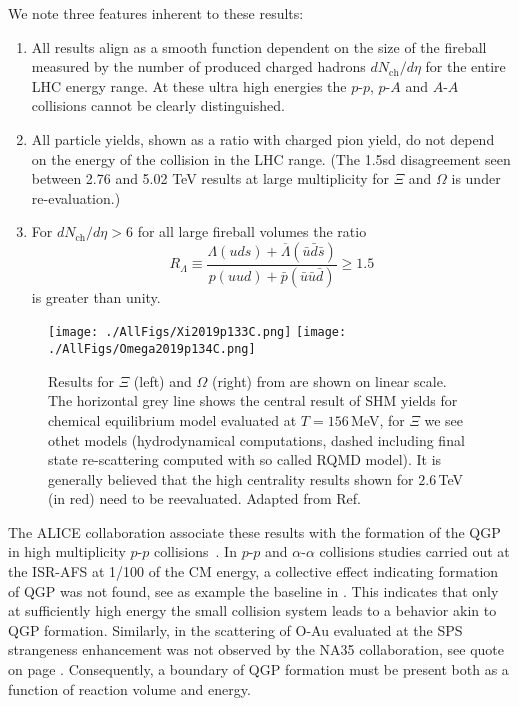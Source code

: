 We note three features inherent to these results:
\begin{enumerate}
\item
All results align as a smooth function dependent on the size of the fireball measured by the number of produced charged hadrons $dN_\mathrm{ch}/d\eta$ for the entire LHC energy range. At these ultra high energies the $p$-$p$, $p$-$A$ and $A$-$A$ collisions cannot be clearly distinguished.
\item
All particle yields, shown as a ratio with charged pion yield, do not depend on the energy of the collision in the LHC range. (The 1.5sd disagreement seen between 2.76 and 5.02 TeV results at large multiplicity for $\Xi$ and $\Omega$ is under re-evaluation.) 
\item
For $dN_\mathrm{ch}/d\eta>6$ for all large fireball volumes the ratio 
\begin{equation}\label{eq:RLambda}
R_\Lambda \equiv \frac{\Lambda(uds)+\overline{\Lambda}(\bar u\bar d\bar s)}
{p(uud)+\bar p(\bar u\bar u\bar d)}\ge 1.5
\end{equation}
is greater than unity. 
\end{enumerate}
 
\begin{figure}[tb]\sidecaption
\centerline{%
\texttt{[image: ./AllFigs/Xi2019p133C.png]} 
\texttt{[image: ./AllFigs/Omega2019p134C.png]} 
}
\caption{%
Results for $\Xi$ (left) and $\Omega$ (right) from  are shown on linear scale. The horizontal grey line shows the central result of SHM yields for chemical equilibrium model evaluated at $T=156$\,MeV, for $\Xi$ we see othet models (hydrodynamical computations, dashed including final state re-scattering computed with so called RQMD model). It is generally believed that the high centrality results shown for $2.6$\,TeV (in red) need to be reevaluated. Adapted from Ref.\cite{Albuquerque:PhD} 
}
\label{fig:hypXO}
\end{figure}


The ALICE collaboration associate these results with the formation of the QGP in high multiplicity $p$-$p$ collisions~\cite{ALICE:2017jyt,Albuquerque:2018kyy,Albuquerque:PhD}. In $p$-$p$ and $\alpha$-$\alpha$ collisions studies carried out at the ISR-AFS at 1/100 of the CM energy, a collective effect indicating formation of QGP was not found, see as example the baseline in . This indicates that only at sufficiently high energy the small collision system leads to a behavior akin to QGP formation. Similarly, in the scattering of O-Au evaluated at the SPS strangeness enhancement was not observed by the NA35 collaboration, see quote on page \pageref{StockOAu}. Consequently, a boundary of QGP formation must be present both as a function of reaction volume and energy.

